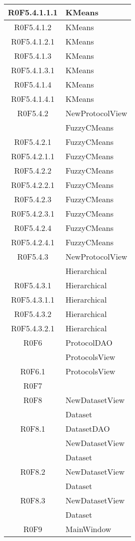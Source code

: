 \begin{center}
\begin{longtable}{|c|l|}
\hline
R0F5.4.1.1.1 & KMeans \\ 
\hline
R0F5.4.1.2 & KMeans \\ 
\hline
R0F5.4.1.2.1 & KMeans \\ 
\hline
R0F5.4.1.3 & KMeans \\ 
\hline
R0F5.4.1.3.1 & KMeans \\ 
\hline
R0F5.4.1.4 & KMeans \\ 
\hline
R0F5.4.1.4.1 & KMeans \\ 
\hline
R0F5.4.2 & NewProtocolView \\ 
 & FuzzyCMeans \\ 
\hline
R0F5.4.2.1 & FuzzyCMeans \\ 
\hline
R0F5.4.2.1.1 & FuzzyCMeans \\ 
\hline
R0F5.4.2.2 & FuzzyCMeans \\ 
\hline
R0F5.4.2.2.1 & FuzzyCMeans \\ 
\hline
R0F5.4.2.3 & FuzzyCMeans \\ 
\hline
R0F5.4.2.3.1 & FuzzyCMeans \\ 
\hline
R0F5.4.2.4 & FuzzyCMeans \\ 
\hline
R0F5.4.2.4.1 & FuzzyCMeans \\ 
\hline
R0F5.4.3 & NewProtocolView \\ 
 & Hierarchical \\ 
\hline
R0F5.4.3.1 & Hierarchical \\ 
\hline
R0F5.4.3.1.1 & Hierarchical \\ 
\hline
R0F5.4.3.2 & Hierarchical \\ 
\hline
R0F5.4.3.2.1 & Hierarchical \\ 
\hline
R0F6 & ProtocolDAO \\ 
 & ProtocolsView \\ 
\hline
R0F6.1 & ProtocolsView \\ 
\hline
R0F7 & \\ 
\hline
R0F8 & NewDatasetView \\ 
 & Dataset \\ 
\hline
R0F8.1 & DatasetDAO \\ 
 & NewDatasetView \\ 
 & Dataset \\ 
\hline
R0F8.2 & NewDatasetView \\ 
 & Dataset \\ 
\hline
R0F8.3 & NewDatasetView \\ 
 & Dataset \\ 
\hline
R0F9 & MainWindow \\ 

\end{longtable}
\end{center}
